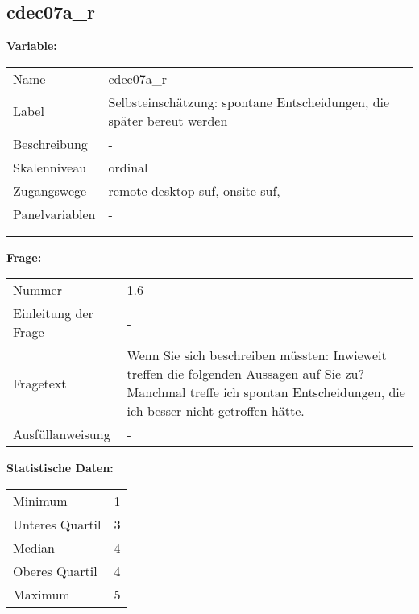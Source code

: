 	
	
	\subsection{cdec07a\_r}
	\label{subSection:cdec07a_r}

	\noindent\textbf{Variable:}\\
		\begin{tabular}{lL{11.3cm}}
			\label{tableVariable:cdec07a_r}
			Name & cdec07a\_r \\
			Label & Selbsteinschätzung: spontane Entscheidungen, die später bereut werden \\
			Beschreibung & - \\
			Skalenniveau & ordinal \\
			Zugangswege &
				remote-desktop-suf,
				onsite-suf,
 \\
			Panelvariablen & -
			 \\
			 \\
 \\
		\end{tabular}

		\vspace*{1 cm}
		\noindent\textbf{Frage:}\\
		\begin{tabular}{lL{11.3cm}}
			\label{tableQuestion:cdec07a_r}
			Nummer & 1.6 \\
			Einleitung der Frage & - \\
			Fragetext & Wenn Sie sich beschreiben müssten: Inwieweit treffen die folgenden Aussagen auf Sie zu?
Manchmal treffe ich spontan Entscheidungen, die ich besser nicht getroffen hätte. \\
			Ausfüllanweisung & - \\
		\end{tabular}


		\vspace*{1 cm}
		\noindent\textbf{Statistische Daten:}\\
			\begin{tabular}{ll}
				\label{tableStatistics:cdec07a_r}
					Minimum & 1 \\
					Unteres Quartil & 3 \\
					Median & 4 \\
					Oberes Quartil & 4 \\
					Maximum & 5 \\
			\end{tabular}



